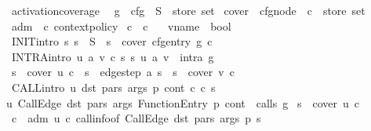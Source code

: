 \begin{isabelle}
\ activation\isacharunderscore{}coverage\ \isacharequal{}\isanewline
\isaindent{\ \ }\ g\ \isacharcolon{}\isacharcolon{}\ cfg\ \ S\ \isacharcolon{}\isacharcolon{}\ \isachardoublequote{}store\ set\isachardoublequote{}\isanewline
\isaindent{\ \ \ \ }\ cover\ \isacharcolon{}\isacharcolon{}\ \isachardoublequote{}cfg\isacharunderscore{}node\ {\isasymRightarrow}\ \isacharprime{}c\ {\isasymRightarrow}\ store\ set\isachardoublequote{}\isanewline
\isaindent{\ \ \ \ }\ adm\ \isacharcolon{}\isacharcolon{}\ \isachardoublequote{}\isacharprime{}c\ context\isacharunderscore{}policy\isachardoublequote{}\isanewline
\isaindent{\ \ \ \ }\ c\ \isacharcolon{}\isacharcolon{}\ \isacharprime{}c\isanewline
\isaindent{\ \ \ \ }\ {\isasymG}\ \isacharcolon{}\isacharcolon{}\ \isachardoublequote{}vname\ {\isasymRightarrow}\ bool\isachardoublequote{}\isanewline
\isaindent{\ \ }\ INIT\isacharbrackleft{}intro\isacharbrackright{}\isacharcolon{}\ \isachardoublequote{}{\isasymAnd}s\isachardot{}\ s\ {\isasymin}\ S\ {\isasymLongrightarrow}\ s\ {\isasymin}\ cover\ \isacharparenleft{}cfg\isacharunderscore{}entry\ g\isacharparenright{}\ c\isachardoublequote{}\isanewline
\isaindent{\ \ \ \ }\ INTRA\isacharbrackleft{}intro\isacharbrackright{}\isacharcolon{}\ \isachardoublequote{}{\isasymAnd}u\ a\ v\ c\ s\ s\isacharprime{}\isachardot{}\ \isacharparenleft{}u\isacharcomma{}\ a\isacharcomma{}\ v\isacharparenright{}\ {\isasymin}\ intra\ g\isanewline
\isaindent{\ \ \ \ \ \ \ \ }{\isasymLongrightarrow}\ s\ {\isasymin}\ cover\ u\ c\ {\isasymLongrightarrow}\ s\isacharprime{}\ {\isasymin}\ edge\isacharunderscore{}step\ a\ s\ {\isasymLongrightarrow}\ s\isacharprime{}\ {\isasymin}\ cover\ v\ c\isachardoublequote{}\isanewline
\isaindent{\ \ \ \ }\ CALL\isacharbrackleft{}intro\isacharbrackright{}\isacharcolon{}\ \isachardoublequote{}{\isasymAnd}u\ dst\ pars\ args\ p\ cont\ c\ c\isacharprime{}\ s\isachardot{}\isanewline
\isaindent{\ \ \ \ \ \ \ \ }\isacharparenleft{}u\isacharcomma{}\ CallEdge\ dst\ pars\ args\isacharcomma{}\ FunctionEntry\ p\isacharcomma{}\ cont\isacharparenright{}\ {\isasymin}\ calls\ g\isanewline
\isaindent{\ \ \ \ \ \ \ \ }{\isasymLongrightarrow}\ s\ {\isasymin}\ cover\ u\ c\isanewline
\isaindent{\ \ \ \ \ \ \ \ }{\isasymLongrightarrow}\ c\isacharprime{}\ {\isasymin}\ adm\ u\ c\ \isacharparenleft{}call\isacharunderscore{}info\isacharunderscore{}of\ \isacharparenleft{}CallEdge\ dst\ pars\ args\isacharparenright{}\ p\isacharparenright{}\ s\isanewline

\end{isabelle}
